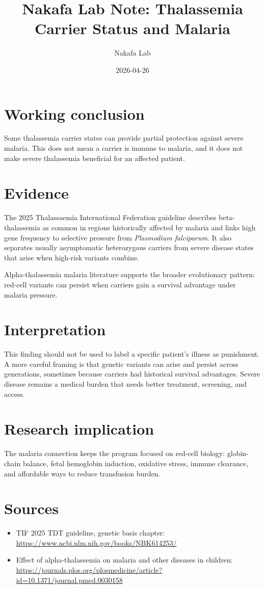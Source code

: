 \documentclass[11pt]{article}
\title{Nakafa Lab Note: Thalassemia Carrier Status and Malaria}
\author{Nakafa Lab}
\date{2026-04-26}
\begin{document}
\maketitle

\section*{Working conclusion}

Some thalassemia carrier states can provide partial protection against severe
malaria. This does not mean a carrier is immune to malaria, and it does not make
severe thalassemia beneficial for an affected patient.

\section*{Evidence}

The 2025 Thalassaemia International Federation guideline describes
beta-thalassemia as common in regions historically affected by malaria and links
high gene frequency to selective pressure from \textit{Plasmodium falciparum}.
It also separates usually asymptomatic heterozygous carriers from severe disease
states that arise when high-risk variants combine.

Alpha-thalassemia malaria literature supports the broader evolutionary pattern:
red-cell variants can persist when carriers gain a survival advantage under
malaria pressure.

\section*{Interpretation}

This finding should not be used to label a specific patient's illness as
punishment. A more careful framing is that genetic variants can arise and persist
across generations, sometimes because carriers had historical survival
advantages. Severe disease remains a medical burden that needs better treatment,
screening, and access.

\section*{Research implication}

The malaria connection keeps the program focused on red-cell biology:
globin-chain balance, fetal hemoglobin induction, oxidative stress, immune
clearance, and affordable ways to reduce transfusion burden.

\section*{Sources}

\begin{itemize}
  \item TIF 2025 TDT guideline, genetic basis chapter:
  \url{https://www.ncbi.nlm.nih.gov/books/NBK614253/}
  \item Effect of alpha-thalassemia on malaria and other diseases in children:
  \url{https://journals.plos.org/plosmedicine/article?id=10.1371/journal.pmed.0030158}
\end{itemize}
\end{document}
